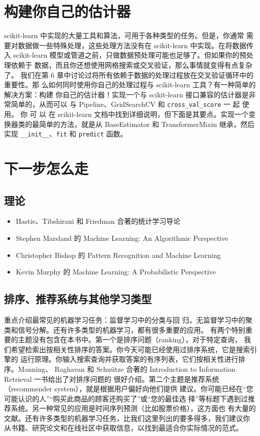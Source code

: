 \section{构建你自己的估计器}
scikit-learn 中实现的大量工具和算法，可用于各种类型的任务。但是，你通常
需要对数据做一些特殊处理，这些处理方法没有在 scikit-learn 中实现。在将数据传入
scikit-learn 模型或管道之前，只做数据预处理可能也足够了。但如果你的预处理依赖于
数据，而且你还想使用网格搜索或交叉验证，那么事情就变得有点复杂了。
我们在第 6 章中讨论过将所有依赖于数据的处理过程放在交叉验证循环中的重要性。那
么如何同时使用你自己的处理过程与 scikit-learn 工具？有一种简单的解决方案：构建
你自己的估计器！实现一个与 scikit-learn 接口兼容的估计器是非常简单的，从而可以
与 Pipeline、GridSearchCV 和 \verb|cross_val_score| 一 起 使 用。 你 可 以 在 scikit-learn 文档中找到详细说明，但下面是其要点。实现一个变换器类的最简单的方法，就是从 BaseEstimator 和
TransformerMixin 继承，然后实现 \verb|__init__|、\verb|fit| 和 \verb|predict| 函数。

\section{下一步怎么走}
\subsection{理论}
\begin{itemize}
    \item Hastie、Tibshirani 和 Friedman 合著的统计学习导论
    \item Stephen Marsland 的 Machine Learning: An Algorithmic Perspective
    \item Christopher Bishop 的 Pattern Recognition and Machine Learning
    \item Kevin Murphy 的 Machine Learning: A Probabilistic Perspective
\end{itemize}
\subsection{排序、推荐系统与其他学习类型}
重点介绍最常见的机器学习任务：监督学习中的分类与回
归，无监督学习中的聚类和信号分解。还有许多类型的机器学习，都有很多重要的应用。
有两个特别重要的主题没有包含在本书中。第一个是排序问题（ranking），对于特定查询，
我们希望检索出按相关性排序的答案。你今天可能已经使用过排序系统，它是搜索引擎的
运行原理。你输入搜索查询并获取答案的有序列表，它们按相关性进行排序。Manning、
Raghavan 和 Schuütze 合著的 Introduction to Information Retrieval 一书给出了对排序问题的
很好介绍。第二个主题是推荐系统（recommender system），就是根据用户偏好向他们提供
建议。你可能已经在“您可能认识的人”“购买此商品的顾客还购买了”或“您的最佳选
择”等标题下遇到过推荐系统。另一种常见的应用是时间序列预测（比如股票价格），这方面也
有大量的文献。还有许多类型的机器学习任务，比我们这里列出的要多得多，我们建议你
从书籍、研究论文和在线社区中获取信息，以找到最适合你实际情况的范式。
